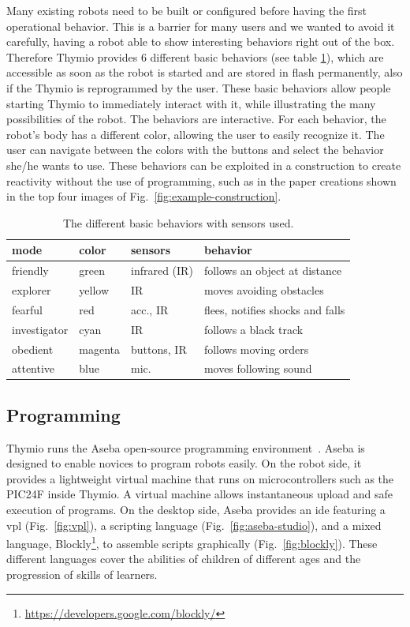 \documentclass[letterpaper, 10 pt, conference]{ieeeconf}  %
\begin{document}
Many existing robots need to be built or configured before having the first operational behavior. 
This is a barrier for many users and we wanted to avoid it carefully, having a robot able to show interesting behaviors right out of the box.
Therefore Thymio provides 6 different basic behaviors (see table \ref{tbl:basic-behaviors}), which are accessible as soon as the robot is started and are stored in flash permanently, also if the Thymio is reprogrammed by the user.
These basic behaviors allow people starting Thymio to immediately interact with it, while illustrating the many possibilities of the robot.
The behaviors are interactive.
For each behavior, the robot's body has a different color, allowing the user to easily recognize it.
The user can navigate between the colors with the buttons and select the behavior she/he wants to use.
These behaviors can be exploited in a construction to create reactivity without the use of programming, such as in the paper creations shown in the top four images of Fig.~\ref{fig:example-construction}.

\begin{table}
\begin{tabularx}{\columnwidth}{@{}llll@{}}
\toprule
mode & color & sensors & behavior \\
\midrule
friendly & green & infrared (IR) & follows an object at distance \\
explorer & yellow & IR & moves avoiding obstacles \\
fearful & red & acc., IR & flees, notifies shocks and falls \\
investigator & cyan & IR & follows a black track \\
obedient & magenta & buttons, IR & follows moving orders \\
attentive & blue & mic. & moves following sound \\
\bottomrule
\end{tabularx}
\caption{The different basic behaviors with sensors used.}
\label{tbl:basic-behaviors}
\end{table}


\subsection{Programming}
\label{sec:aseba}

Thymio runs the Aseba open-source programming environment~\cite{aseba}.
Aseba is designed to enable novices to program robots easily.
On the robot side, it provides a lightweight virtual machine that runs on microcontrollers such as the PIC24F inside Thymio.
A virtual machine allows instantaneous upload and safe execution of programs.
On the desktop side, Aseba provides an \ac{ide} featuring a \ac{vpl} (Fig.~\ref{fig:vpl}), a scripting language (Fig.~\ref{fig:aseba-studio}), and a mixed language, Blockly\footnote{\url{https://developers.google.com/blockly/}}, to assemble scripts graphically (Fig.~\ref{fig:blockly}).
These different languages cover the abilities of children of different ages and the progression of skills of learners.
\end{document}
